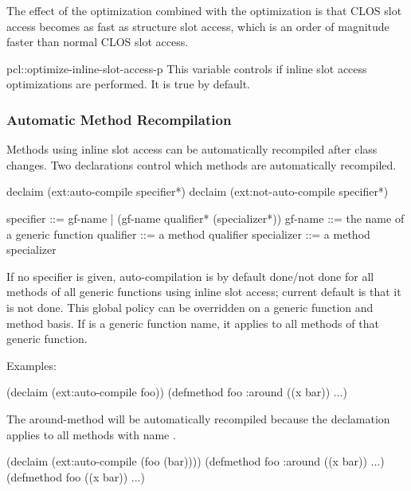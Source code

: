 The effect of the  optimization combined with the
 optimization is that CLOS slot access becomes as
fast as structure slot access, which is an order of magnitude faster
than normal CLOS slot access.

\begin{defvar}{pcl::}{optimize-inline-slot-access-p}
  This variable controls if inline slot access optimizations are
  performed.  It is true by default.
\end{defvar}



\subsubsection{Automatic Method Recompilation}
  
Methods using inline slot access can be automatically recompiled after
class changes.  Two declarations control which methods are
automatically recompiled.

\begin{example}
declaim (ext:auto-compile specifier*)
declaim (ext:not-auto-compile specifier*)

specifier   ::= gf-name | (gf-name qualifier* (specializer*))
gf-name     ::= the name of a generic function
qualifier   ::= a method qualifier
specializer ::= a method specializer
\end{example}

If no specifier is given, auto-compilation is by default done/not done
for all methods of all generic functions using inline slot access;
current default is that it is not done.  This global policy can be
overridden on a generic function and method basis.  If
 is a generic function name, it applies to all methods
of that generic function.

Examples:

\begin{example}
(declaim (ext:auto-compile foo))
(defmethod foo :around ((x bar)) ...)
\end{example}

The around-method  will be automatically recompiled because
the declamation applies to all methods with name .

\begin{example}
(declaim (ext:auto-compile (foo (bar))))
(defmethod foo :around ((x bar)) ...)
(defmethod foo ((x bar)) ...)
\end{example}

